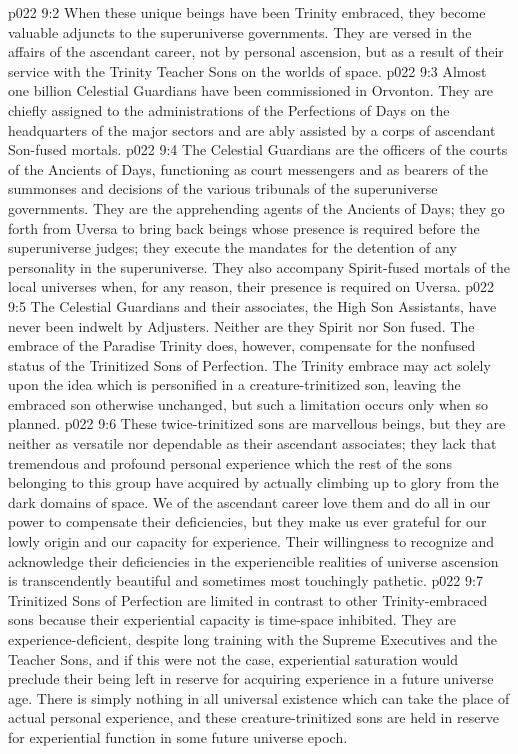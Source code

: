 \vs p022 9:2 When these unique beings have been Trinity embraced, they become valuable adjuncts to the superuniverse governments. They are versed in the affairs of the ascendant career, not by personal ascension, but as a result of their service with the Trinity Teacher Sons on the worlds of space.
\vs p022 9:3 \pc Almost one billion Celestial Guardians have been commissioned in Orvonton. They are chiefly assigned to the administrations of the Perfections of Days on the headquarters of the major sectors and are ably assisted by a corps of ascendant Son\hyp{}fused mortals.
\vs p022 9:4 The Celestial Guardians are the officers of the courts of the Ancients of Days, functioning as court messengers and as bearers of the summonses and decisions of the various tribunals of the superuniverse governments. They are the apprehending agents of the Ancients of Days; they go forth from Uversa to bring back beings whose presence is required before the superuniverse judges; they execute the mandates for the detention of any personality in the superuniverse. They also accompany Spirit\hyp{}fused mortals of the local universes when, for any reason, their presence is required on Uversa.
\vs p022 9:5 \pc The Celestial Guardians and their associates, the High Son Assistants, have never been indwelt by Adjusters. Neither are they Spirit nor Son fused. The embrace of the Paradise Trinity does, however, compensate for the nonfused status of the Trinitized Sons of Perfection. The Trinity embrace may act solely upon the idea which is personified in a creature\hyp{}trinitized son, leaving the embraced son otherwise unchanged, but such a limitation occurs only when so planned.
\vs p022 9:6 These twice\hyp{}trinitized sons are marvellous beings, but they are neither as versatile nor dependable as their ascendant associates; they lack that tremendous and profound personal experience which the rest of the sons belonging to this group have acquired by actually climbing up to glory from the dark domains of space. We of the ascendant career love them and do all in our power to compensate their deficiencies, but they make us ever grateful for our lowly origin and our capacity for experience. Their willingness to recognize and acknowledge their deficiencies in the experiencible realities of universe ascension is transcendently beautiful and sometimes most touchingly pathetic.
\vs p022 9:7 Trinitized Sons of Perfection are limited in contrast to other Trinity\hyp{}embraced sons because their experiential capacity is time\hyp{}space inhibited. They are experience\hyp{}deficient, despite long training with the Supreme Executives and the Teacher Sons, and if this were not the case, experiential saturation would preclude their being left in reserve for acquiring experience in a future universe age. There is simply nothing in all universal existence which can take the place of actual personal experience, and these creature\hyp{}trinitized sons are held in reserve for experiential function in some future universe epoch.
